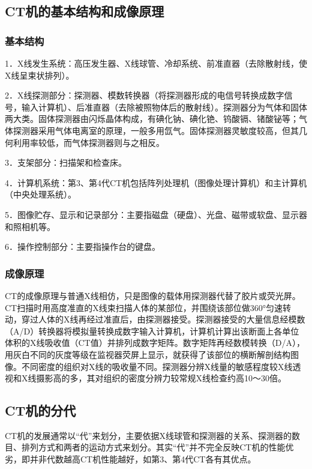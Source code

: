 \subsection{CT机的基本结构和成像原理}

\subsubsection{基本结构}

1．X线发生系统：高压发生器、X线球管、冷却系统、前准直器（去除散射线，使X线呈束状排列）。

2．X线探测部分：探测器、模数转换器（将探测器形成的电信号转换成数字信号，输入计算机）、后准直器（去除被照物体后的散射线）。探测器分为气体和固体两大类。固体探测器由闪烁晶体构成，有碘化钠、碘化铯、钨酸镉、锗酸铋等；气体探测器采用气体电离室的原理，一般多用氙气。固体探测器灵敏度较高，但其几何利用率较低，而气体探测器则与之相反。

3．支架部分：扫描架和检查床。

4．计算机系统：第3、第4代CT机包括阵列处理机（图像处理计算机）和主计算机（中央处理系统）。

5．图像贮存、显示和记录部分：主要指磁盘（硬盘）、光盘、磁带或软盘、显示器和照相机等。

6．操作控制部分：主要指操作台的键盘。

\subsubsection{成像原理}

CT的成像原理与普通X线相仿，只是图像的载体用探测器代替了胶片或荧光屏。CT扫描时用高度准直的X线束扫描人体的某部位，并围绕该部位做360°匀速转动，穿过人体的X线再经过准直后，由探测器接受。探测器接受的大量信息经模数（A/D）转换器将模拟量转换成数字输入计算机，计算机计算出该断面上各单位体积的X线吸收值（CT值）并排列成数字矩阵。数字矩阵再经数模转换（D/A），用灰白不同的灰度等级在监视器荧屏上显示，就获得了该部位的横断解剖结构图像。不同密度的组织对X线的吸收量不同。探测器分辨X线量的敏感程度较X线透视和X线摄影高的多，其对组织的密度分辨力较常规X线检查约高10～30倍。

\subsection{CT机的分代}

CT机的发展通常以“代”来划分，主要依据X线球管和探测器的关系、探测器的数目、排列方式和两者的运动方式来划分。其实“代”并不完全反映CT机的性能优劣，即并非代数越高CT机性能越好，如第3、第4代CT各有其优点。

